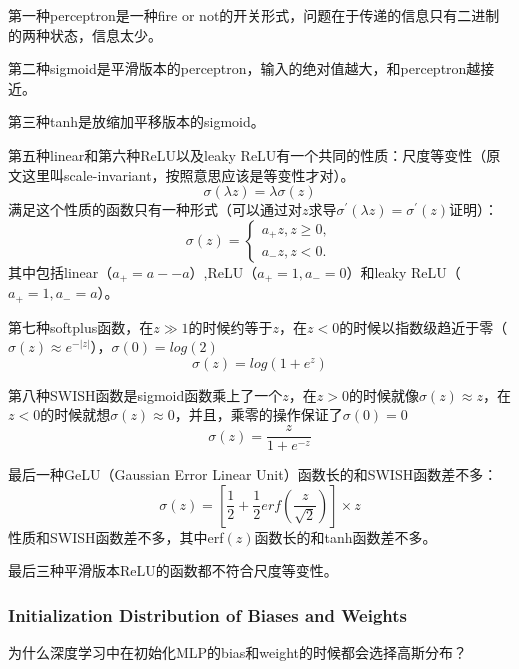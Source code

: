 第一种perceptron是一种fire or not的开关形式，问题在于传递的信息只有二进制的两种状态，信息太少。

第二种sigmoid是平滑版本的perceptron，输入的绝对值越大，和perceptron越接近。

第三种tanh是放缩加平移版本的sigmoid。

第五种linear和第六种ReLU以及leaky ReLU有一个共同的性质：尺度等变性（原文这里叫scale-invariant，按照意思应该是等变性才对）。
\begin{equation}
    \sigma(\lambda z)=\lambda \sigma(z)
\end{equation}
满足这个性质的函数只有一种形式（可以通过对$z$求导$\sigma^{'}(\lambda z)=\sigma^{'}(z)$证明）：
\begin{equation}
    \sigma(z)=\left\{
        \begin{aligned}
            a_{+}z, z\geq 0,\\
            a_{-}z, z< 0.
        \end{aligned}
    \right.
\end{equation}
其中包括linear（$a_{+}=a{-}-a$）,ReLU（$a_{+}=1, a_{-}=0$）和leaky ReLU（$a_{+}=1, a_{-}=a$）。

第七种softplus函数，在$z\gg 1$的时候约等于$z$，在$z<0$的时候以指数级趋近于零（$\sigma(z)\approx e^{-|z|}$），$\sigma(0)=log(2)$
\begin{equation}
    \sigma(z)=log(1+e^z)
\end{equation}

第八种SWISH函数是sigmoid函数乘上了一个$z$，在$z>0$的时候就像$\sigma(z)\approx z$，在$z<0$的时候就想$\sigma(z)\approx 0$，并且，乘零的操作保证了$\sigma(0)=0$
\begin{equation}
    \sigma(z)=\frac{z}{1+e^{-z}}
\end{equation}

最后一种GeLU（Gaussian Error Linear Unit）函数长的和SWISH函数差不多：
\begin{equation}
    \sigma(z)=[\frac{1}{2}+\frac{1}{2}erf(\frac{z}{\sqrt{2}})]\times z
\end{equation}
性质和SWISH函数差不多，其中erf$(z)$函数长的和tanh函数差不多。

最后三种平滑版本ReLU的函数都不符合尺度等变性。

\subsubsection{Initialization Distribution of Biases and Weights}
为什么深度学习中在初始化MLP的bias和weight的时候都会选择高斯分布？


